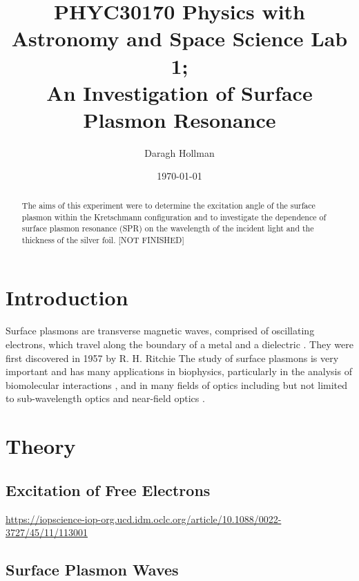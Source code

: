 \documentclass[%
reprint,
amsmath,amssymb,
aps,
]{revtex4-2}
\begin{document}
	
	
	\title{PHYC30170 Physics with Astronomy and Space Science Lab 1;\\An Investigation of Surface Plasmon Resonance}
	
	\author{Daragh Hollman}
	
	\date{\today}
	
	\begin{abstract}
		The aims of this experiment were to determine the excitation angle of the surface plasmon within the Kretschmann configuration and to investigate the dependence of surface plasmon resonance (SPR) on the wavelength of the incident light and the thickness of the silver foil. [NOT FINISHED]
	\end{abstract}

	\maketitle
	
	\section{Introduction}		
		Surface plasmons are transverse magnetic waves, comprised of oscillating electrons, which travel along the boundary of a metal and a dielectric \cite{undergradToledo}. They were first discovered in 1957 by R. H. Ritchie The study of surface plasmons is very important and has many applications in biophysics, particularly in the analysis of biomolecular interactions \cite{biomedicalApplications}, and in many fields of optics including but not limited to sub-wavelength optics and near-field optics \cite{opticalApplications}.
	
	\section{Theory}
		\subsection{Excitation of Free Electrons}
			\url{https://iopscience-iop-org.ucd.idm.oclc.org/article/10.1088/0022-3727/45/11/113001}
		
		\subsection{Surface Plasmon Waves}
		
\end{document}
